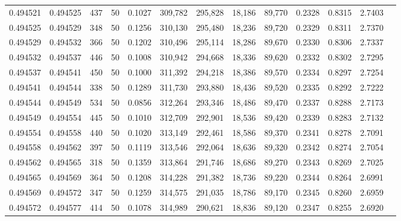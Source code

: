 \begin{tabular}{rrrrrrrrrrrrr}
0.494521 & 0.494525 &   437 &  50 &                                     0.1027 & 309,782 & 295,828 &  18,186 &  89,770 & 0.2328 & 0.8315 & 2.7403 \\
0.494525 & 0.494529 &   348 &  50 &                                     0.1256 & 310,130 & 295,480 &  18,236 &  89,720 & 0.2329 & 0.8311 & 2.7370 \\
0.494529 & 0.494532 &   366 &  50 &                                     0.1202 & 310,496 & 295,114 &  18,286 &  89,670 & 0.2330 & 0.8306 & 2.7337 \\
0.494532 & 0.494537 &   446 &  50 &                                     0.1008 & 310,942 & 294,668 &  18,336 &  89,620 & 0.2332 & 0.8302 & 2.7295 \\
0.494537 & 0.494541 &   450 &  50 &                                     0.1000 & 311,392 & 294,218 &  18,386 &  89,570 & 0.2334 & 0.8297 & 2.7254 \\
0.494541 & 0.494544 &   338 &  50 &                                     0.1289 & 311,730 & 293,880 &  18,436 &  89,520 & 0.2335 & 0.8292 & 2.7222 \\
0.494544 & 0.494549 &   534 &  50 &                                     0.0856 & 312,264 & 293,346 &  18,486 &  89,470 & 0.2337 & 0.8288 & 2.7173 \\
0.494549 & 0.494554 &   445 &  50 &                                     0.1010 & 312,709 & 292,901 &  18,536 &  89,420 & 0.2339 & 0.8283 & 2.7132 \\
0.494554 & 0.494558 &   440 &  50 &                                     0.1020 & 313,149 & 292,461 &  18,586 &  89,370 & 0.2341 & 0.8278 & 2.7091 \\
0.494558 & 0.494562 &   397 &  50 &                                     0.1119 & 313,546 & 292,064 &  18,636 &  89,320 & 0.2342 & 0.8274 & 2.7054 \\
0.494562 & 0.494565 &   318 &  50 &                                     0.1359 & 313,864 & 291,746 &  18,686 &  89,270 & 0.2343 & 0.8269 & 2.7025 \\
0.494565 & 0.494569 &   364 &  50 &                                     0.1208 & 314,228 & 291,382 &  18,736 &  89,220 & 0.2344 & 0.8264 & 2.6991 \\
0.494569 & 0.494572 &   347 &  50 &                                     0.1259 & 314,575 & 291,035 &  18,786 &  89,170 & 0.2345 & 0.8260 & 2.6959 \\
0.494572 & 0.494577 &   414 &  50 &                                     0.1078 & 314,989 & 290,621 &  18,836 &  89,120 & 0.2347 & 0.8255 & 2.6920 \\

\end{tabular}
